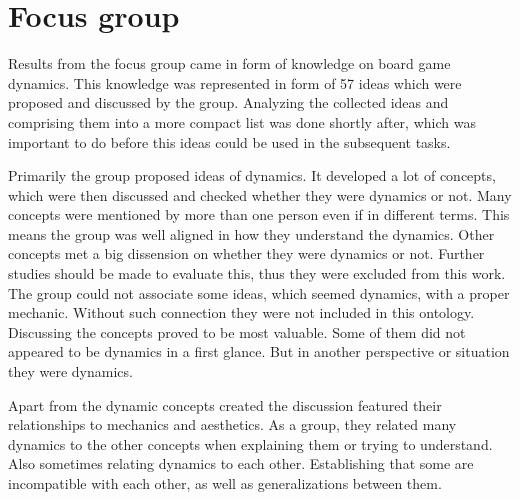 \section{Focus group} 

Results from the focus group came in form of knowledge on board game dynamics. This knowledge was represented in form of 57 ideas which were proposed and discussed by the group. Analyzing the collected ideas and comprising them into a more compact list was done shortly after, which was important to do before this ideas could be used in the subsequent tasks. 

Primarily the group proposed ideas of dynamics. It developed a lot of concepts, which were then discussed and checked whether they were dynamics or not. Many concepts were mentioned by more than one person even if in different terms. This means the group was well aligned in how they understand the dynamics. Other concepts met a big dissension on whether they were dynamics or not. Further studies should be made to evaluate this, thus they were excluded from this work. The group could not associate some ideas, which seemed dynamics, with a proper mechanic. Without such connection they were not included in this ontology. Discussing the concepts proved to be most valuable. Some of them did not appeared to be dynamics in a first glance. But in another perspective or situation they were dynamics.

Apart from the dynamic concepts created the discussion featured their relationships to mechanics and aesthetics. As a group, they related many dynamics to the other concepts when explaining them or trying to understand. Also sometimes relating dynamics to each other. Establishing that some are incompatible with each other, as well as generalizations between them.

